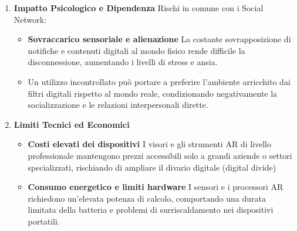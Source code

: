 \begin{enumerate}
\begin{itemize}
        \item \textbf{Falsificazione del contesto (Reality Hacking)} \newline
       Sovrapporre elementi grafici non autorizzati o ingannevoli su luoghi fisici (come pubblicità abusive, messaggi diffamatori o informazioni manipolate) può alterare la percezione della realtà da parte degli utenti.

    \end{itemize}

     \item \textbf{Impatto Psicologico e Dipendenza} \newline
     Rischi in comune con i Social Network:
    \begin{itemize}
        \item \textbf{Sovraccarico sensoriale e alienazione} \newline
        La costante sovrapposizione di notifiche e contenuti digitali al mondo fisico rende difficile la disconnessione, aumentando i livelli di stress e ansia.

        \item \textbf{} Un utilizzo incontrollato può portare a preferire l'ambiente arricchito dai filtri digitali rispetto al mondo reale, condizionando negativamente la socializzazione e le relazioni interpersonali dirette.


    \end{itemize}

    \item \textbf{Limiti Tecnici ed Economici} \newline
     
    \begin{itemize}
        \item \textbf{Costi elevati dei dispositivi} \newline
        I visori e gli strumenti AR di livello professionale mantengono prezzi accessibili solo a grandi aziende o settori specializzati, rischiando di ampliare il divario digitale (digital divide)

        \item \textbf{Consumo energetico e limiti hardware} \newline
        I sensori e i processori AR richiedono un'elevata potenza di calcolo, comportando una durata limitata della batteria e problemi di surriscaldamento nei dispositivi portatili.


    \end{itemize}

\end{enumerate}



